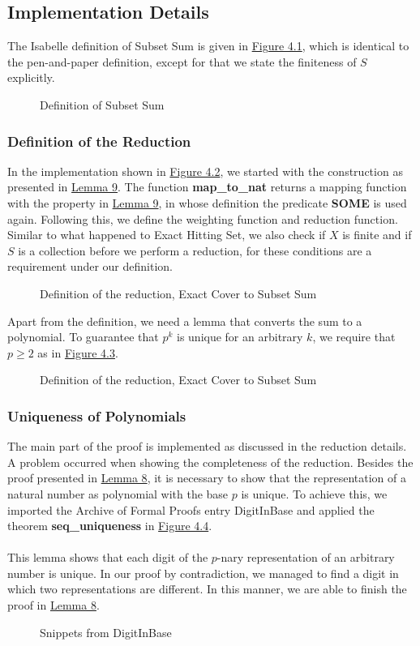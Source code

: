 \subsection{Implementation Details}
The Isabelle definition of Subset Sum is given in \hyperref[fig:4.1]{Figure 4.1}, which is identical to the pen-and-paper definition,
except for that we state the finiteness of $S$ explicitly.
\begin{figure}[!h]
    \caption{Definition of Subset Sum}
    \label{fig:4.1}
\end{figure}
\subsubsection{Definition of the Reduction}
In the implementation shown in \hyperref[fig:4.2]{Figure 4.2}, we started with the construction as presented in \hyperref[lemma:9]{Lemma 9}. The function \textbf{map\_to\_nat} returns 
a mapping function with the property in \hyperref[lemma:9]{Lemma 9}, in whose definition the predicate \textbf{SOME} is used again.
Following this, we define the weighting function and reduction function. 
Similar to what happened to Exact Hitting Set, we also check if $X$ is finite and if $S$ is 
a collection before we perform a reduction, for these conditions are a requirement under our definition. 
\begin{figure}[!h]
    \caption{Definition of the reduction, Exact Cover to Subset Sum}
    \label{fig:4.2}
\end{figure}
Apart from the definition, we need a lemma that converts the sum to a polynomial. To guarantee that $p^k$ is unique for an arbitrary $k$, 
we require that $p \geq 2$ as in \hyperref[fig:4.3]{Figure 4.3}.
\begin{figure}[!h]
    \caption{Definition of the reduction, Exact Cover to Subset Sum}
    \label{fig:4.3}
\end{figure}

\subsubsection{Uniqueness of Polynomials}
The main part of the proof is implemented as discussed in the reduction details. A problem occurred when showing the completeness of the reduction. 
Besides the proof presented in \hyperref[lemma:8]{Lemma 8}, it is necessary to show that the representation of a natural number as
polynomial with the base $p$ is unique. To achieve this, we imported the Archive of Formal Proofs entry DigitInBase \cite{DigitsInBase-AFP} and applied the theorem \textbf{seq\_uniqueness}
in \hyperref[fig:4.4]{Figure 4.4}.\\\\
This lemma shows that each digit of the $p$-nary representation of an arbitrary number is unique. 
In our proof by contradiction, we managed to find a digit in which two representations are different. 
In this manner, we are able to finish the proof in \hyperref[lemma:8]{Lemma 8}.
\begin{figure}[!h]
    \caption{Snippets from DigitInBase}
    \label{fig:4.4}
\end{figure}
